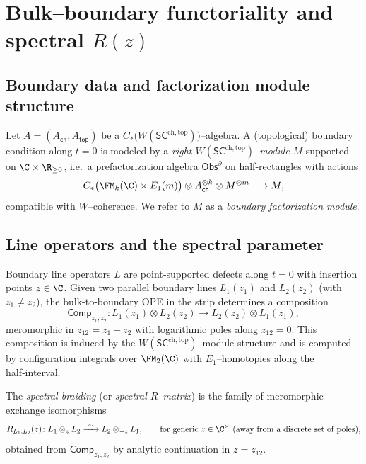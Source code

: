 \section{Bulk–boundary functoriality and spectral $R(z)$}

\subsection{Boundary data and factorization module structure}
Let $A=(A_{\mathsf{ch}},A_{\mathsf{top}})$ be a $C_\ast\!\bigl(W(\mathsf{SC}^{\mathrm{ch,top}})\bigr)$–algebra.
A (topological) boundary condition along $t=0$ is modeled by a \emph{right $W(\mathsf{SC}^{\mathrm{ch,top}})$–module} $M$ supported on $\C\times \R_{\ge 0}$, i.e.\ a prefactorization algebra $\mathsf{Obs}^{\partial}$ on half‑rectangles with actions
\[
C_\ast\bigl(\FM_k(\C)\times E_1(m)\bigr)\otimes A_{\mathsf{ch}}^{\otimes k}\otimes M^{\otimes m}\longrightarrow M,
\]
compatible with $W$–coherence. We refer to $M$ as a \emph{boundary factorization module}.

\subsection{Line operators and the spectral parameter}
Boundary line operators $L$ are point‑supported defects along $t=0$ with insertion points $z\in\C$.
Given two parallel boundary lines $L_1(z_1)$ and $L_2(z_2)$ (with $z_1\neq z_2$), the bulk-to-boundary OPE in the strip determines a composition
\[
\mathsf{Comp}_{z_1,z_2} \colon L_1(z_1)\otimes L_2(z_2) \longrightarrow L_2(z_2)\otimes L_1(z_1),
\]
meromorphic in $z_{12}=z_1-z_2$ with logarithmic poles along $z_{12}=0$.
This composition is induced by the $W(\mathsf{SC}^{\mathrm{ch,top}})$–module structure and is computed by configuration integrals over $\FM_2(\C)$ with $E_1$–homotopies along the half‑interval.

\begin{definition}
The \emph{spectral braiding} (or \emph{spectral $R$–matrix}) is the
family of meromorphic exchange isomorphisms
\[
R_{L_1,L_2}(z)\colon L_1\otimes_z L_2
 \xrightarrow{\ \sim\ } L_2\otimes_{-z} L_1,
\qquad \text{for generic } z\in \C^\times \text{ (away from a discrete set of poles)},
\]
obtained from $\mathsf{Comp}_{z_1,z_2}$ by analytic continuation in $z=z_{12}$.
\end{definition}

